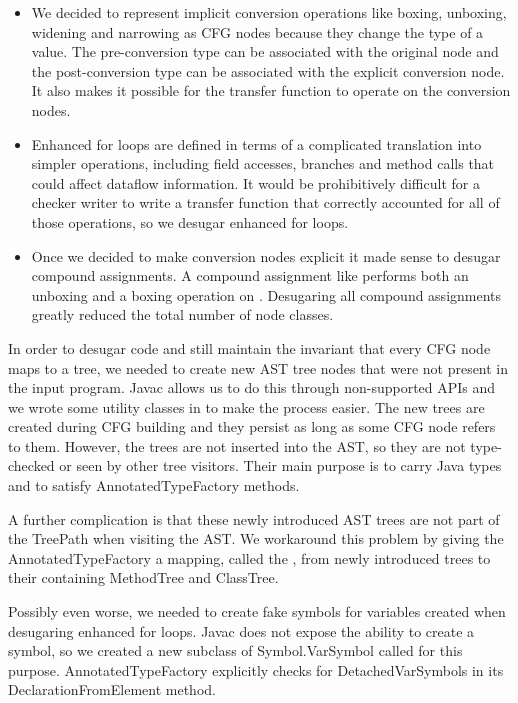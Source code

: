     \begin{itemize}
    \item We decided to represent implicit conversion operations like boxing, unboxing, widening
    and narrowing as CFG nodes because they change the type of a value.  The pre-conversion
    type can be associated with the original node and the post-conversion type can be associated
    with the explicit conversion node.  It also makes it possible for the transfer function to operate
    on the conversion nodes.
    
    \item Enhanced for loops are defined in terms of a complicated translation into simpler
    operations, including field accesses, branches and method calls that could affect dataflow
    information.  It would be prohibitively difficult for a checker writer to write a transfer function that
    correctly accounted for all of those operations, so we desugar enhanced for loops.
    
    \item Once we decided to make conversion nodes explicit it made sense to desugar
    compound assignments.  A compound assignment like  performs
    both an unboxing and a boxing operation on .  Desugaring all compound assignments
    greatly reduced the total number of node classes.

    \end{itemize}

In order to desugar code and still maintain the invariant that every CFG node maps to a tree, 
we needed to create new AST tree nodes that were not present in the input program.  Javac
allows us to do this through non-supported APIs and we wrote some utility classes in
 to make the process easier.  The new trees are created during CFG building
and they persist as long as some CFG node refers to them.  However, the trees are not
inserted into the AST, so they are not type-checked or seen by other tree visitors.  Their
main purpose is to carry Java types and to satisfy AnnotatedTypeFactory methods.

A further complication is that these newly introduced AST trees are not part of the TreePath
when visiting the AST.  We workaround this problem by giving the AnnotatedTypeFactory a
mapping, called the , from newly introduced trees to their containing
MethodTree and ClassTree.

Possibly even worse, we needed to create fake symbols for variables created when
desugaring enhanced for loops.  Javac does not expose the ability to create a symbol,
so we created a new subclass of Symbol.VarSymbol called  for this purpose.  AnnotatedTypeFactory
explicitly checks for DetachedVarSymbols in its DeclarationFromElement method.



